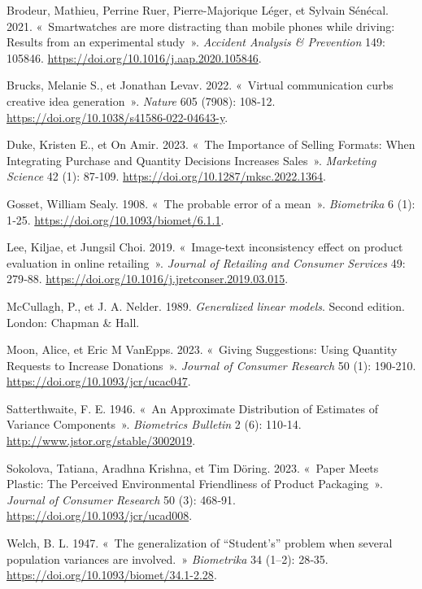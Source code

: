 \documentclass[
  11pt,
  letterpaper,
]{scrbook}
\newlength{\cslhangindent}
\newenvironment{CSLReferences}[2] %
 {\begin{list}{}{%
  \setlength{\itemindent}{0pt}
  \setlength{\leftmargin}{0pt}
  \setlength{\parsep}{0pt}
  \ifodd #1
   \setlength{\leftmargin}{\cslhangindent}
   \setlength{\itemindent}{-1\cslhangindent}
  \fi
  \setlength{\itemsep}{#2\baselineskip}}}
 {\end{list}}
\theoremstyle{definition}
\theoremstyle{definition}
\theoremstyle{remark}
\begin{document}
\label{refs}
\begin{CSLReferences}{1}{0}
Brodeur, Mathieu, Perrine Ruer, Pierre-Majorique Léger, et Sylvain
Sénécal. 2021. {«~Smartwatches are more distracting than mobile phones
while driving: Results from an experimental study~»}. \emph{Accident
Analysis \& Prevention} 149: 105846.
\url{https://doi.org/10.1016/j.aap.2020.105846}.

Brucks, Melanie S., et Jonathan Levav. 2022. {«~Virtual communication
curbs creative idea generation~»}. \emph{Nature} 605 (7908): 108‑12.
\url{https://doi.org/10.1038/s41586-022-04643-y}.

Duke, Kristen E., et On Amir. 2023. {«~The Importance of Selling
Formats: When Integrating Purchase and Quantity Decisions Increases
Sales~»}. \emph{Marketing Science} 42 (1): 87‑109.
\url{https://doi.org/10.1287/mksc.2022.1364}.

Gosset, William Sealy. 1908. {«~The probable error of a mean~»}.
\emph{Biometrika} 6 (1): 1‑25.
\url{https://doi.org/10.1093/biomet/6.1.1}.

Lee, Kiljae, et Jungsil Choi. 2019. {«~Image-text inconsistency effect
on product evaluation in online retailing~»}. \emph{Journal of Retailing
and Consumer Services} 49: 279‑88.
\url{https://doi.org/10.1016/j.jretconser.2019.03.015}.

McCullagh, P., et J. A. Nelder. 1989. \emph{Generalized linear models}.
{S}econd edition. London: Chapman \& Hall.

Moon, Alice, et Eric M VanEpps. 2023. {«~Giving Suggestions: Using
Quantity Requests to Increase Donations~»}. \emph{Journal of Consumer
Research} 50 (1): 190‑210. \url{https://doi.org/10.1093/jcr/ucac047}.

Satterthwaite, F. E. 1946. {«~An Approximate Distribution of Estimates
of Variance Components~»}. \emph{Biometrics Bulletin} 2 (6): 110‑14.
\url{http://www.jstor.org/stable/3002019}.

Sokolova, Tatiana, Aradhna Krishna, et Tim Döring. 2023. {«~Paper Meets
Plastic: The Perceived Environmental Friendliness of Product
Packaging~»}. \emph{Journal of Consumer Research} 50 (3): 468‑91.
\url{https://doi.org/10.1093/jcr/ucad008}.

Welch, B. L. 1947. {«~The generalization of {``Student's''} problem when
several population variances are involved.~»} \emph{Biometrika} 34
(1--2): 28‑35. \url{https://doi.org/10.1093/biomet/34.1-2.28}.

\end{CSLReferences}


\backmatter
\end{document}
